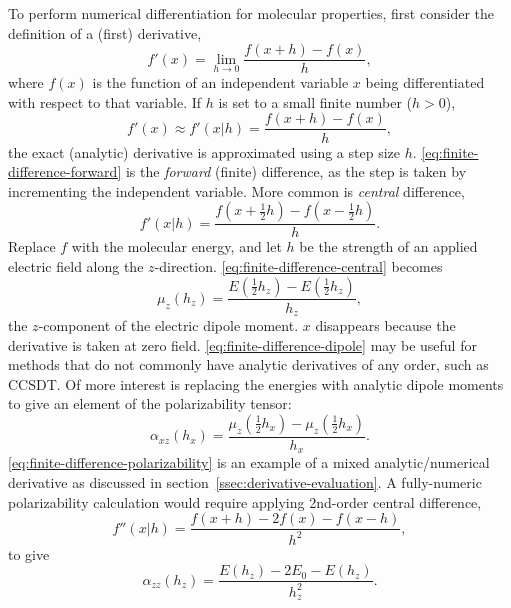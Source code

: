 \documentclass[%
class = book,%
crop = false,%
float = true,%
multi = true,%
preview = false,%
]{standalone}
\begin{document}
To perform numerical differentiation for molecular properties, first consider the definition of a (first) derivative,
\begin{equation}
  \label{eq:explicit-derivative}
  f'(x) = \lim_{h\rightarrow 0} \frac{f(x + h) - f(x)}{h},
\end{equation}
where \(f(x)\) is the function of an independent variable \(x\) being differentiated with respect to that variable. If \(h\) is set to a small finite number (\(h > 0\)),
\begin{equation}
  \label{eq:finite-difference-forward}
  f'(x) \approx f'(x|h) = \frac{f(x + h) - f(x)}{h},
\end{equation}
the exact (analytic) derivative is approximated using a step size \(h\). \eqref{eq:finite-difference-forward} is the \textit{forward} (finite) difference, as the step is taken by incrementing the independent variable. More common is \textit{central} difference,
\begin{equation}
  \label{eq:finite-difference-central}
  f'(x|h) = \frac{f(x + \frac{1}{2}h) - f(x - \frac{1}{2}h)}{h}.
\end{equation}
Replace \(f\) with the molecular energy, and let \(h\) be the strength of an applied electric field along the \(z\)-direction. \eqref{eq:finite-difference-central} becomes
\begin{equation}
  \label{eq:finite-difference-dipole}
  \mu_{z}(h_{z}) = \frac{E(\frac{1}{2}h_{z}) - E(\frac{1}{2}h_{z})}{h_{z}},
\end{equation}
the \(z\)-component of the electric dipole moment. \(x\) disappears because the derivative is taken at zero field. \eqref{eq:finite-difference-dipole} may be useful for methods that do not commonly have analytic derivatives of any order, such as CCSDT. Of more interest is replacing the energies with analytic dipole moments to give an element of the polarizability tensor:
\begin{equation}
  \label{eq:finite-difference-polarizability}
  \alpha_{xz}(h_{x}) = \frac{\mu_{z}(\frac{1}{2}h_{x}) - \mu_{z}(\frac{1}{2}h_{x})}{h_{x}}.
\end{equation}
\eqref{eq:finite-difference-polarizability} is an example of a mixed analytic/numerical derivative as discussed in section~\ref{ssec:derivative-evaluation}. A fully-numeric polarizability calculation would require applying 2nd-order central difference,
\begin{equation}
  \label{eq:finite-difference-central-2}
  f''(x|h) = \frac{f(x + h) - 2f(x) - f(x - h)}{h^{2}},
\end{equation}
to give
\begin{equation}
  \label{eq:finite-difference-polarizability2}
  \alpha_{zz}(h_{z}) = \frac{E(h_{z}) - 2E_{0} - E(h_{z})}{h_{z}^{2}}.
\end{equation}
\end{document}
